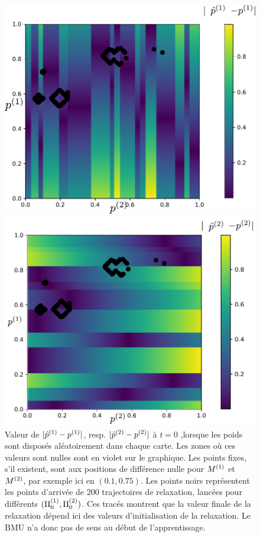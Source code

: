\documentclass[../main]{subfiles}
\begin{document}
\begin{figure}
	\begin{minipage}{0.5\textwidth}
	\centering
	\includegraphics[width=\textwidth]{champ_X_006_t1_notraj.pdf}
	\end{minipage}
	\begin{minipage}{0.5\textwidth}
	\centering
	\includegraphics[width=\textwidth]{champ_Y_006_t1_notraj.pdf}
	\end{minipage}
	\caption{Valeur de $\lvert {\hat{p}}^{({1})} - p^{({1})} \rvert $, resp. $\lvert {\hat{p}}^{({2})} - p^{({2})} \rvert$ à $t=0$ ,lorsque les poids sont disposés aléatoirement dans chaque carte.
	Les zones où ces valeurs sont nulles sont en violet sur le graphique. Les points fixes, s'il existent, sont aux positions de différence nulle pour $M^{({1})}$ et $M^{({2})}$, par exemple ici en $(0.1, 0.75)$.
	Les points noirs représentent les points d'arrivée de 200 trajectoires de relaxation, lancées pour différents $(\Pi_0^{({1})}, \Pi_0^{({2})})$.
	Ces tracés montrent que la valeur finale de la relaxation dépend ici des valeurs d'initialisation de la relaxation. Le BMU n'a donc pas de sens au début de l'apprentissage. \label{fig:diff_relax_t1_notraj}}
	\end{figure}
\end{document}
